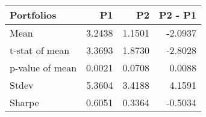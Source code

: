 \begin{tabular}{lrrr}
\toprule
Portfolios & P1 & P2 & P2 - P1 \\
\midrule
Mean & 3.2438 & 1.1501 & -2.0937 \\
t-stat of mean & 3.3693 & 1.8730 & -2.8028 \\
p-value of mean & 0.0021 & 0.0708 & 0.0088 \\
Stdev & 5.3604 & 3.4188 & 4.1591 \\
Sharpe & 0.6051 & 0.3364 & -0.5034 \\
\bottomrule
\end{tabular}
